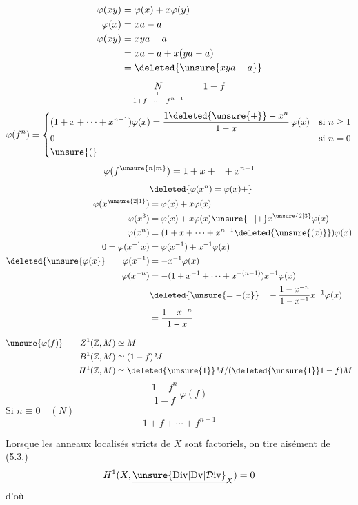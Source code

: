 {\[
\begin{aligned}
\varphi(xy)&=\varphi(x)+x\varphi(y)\\
\varphi(x)&=xa-a\\
\varphi(xy)&=xya-a\\
&=xa-a+x(ya-a)\\
&=\deleted{\unsure{xya-a}}
\end{aligned}
\]
\[
\underset{\substack{\shortparallel\\1+f+\cdots+f^{n-1}}}{N}\qquad 1-f
\]
\[
\varphi(f^n)=
\begin{cases}
(1+x+\cdots+x^{n-1})\varphi(x)=\dfrac{1\deleted{\unsure{+}}-x^n}{1-x}\,\varphi(x)&\text{si }n\geq1\\
0&\text{si }n=0\\
\unsure{(}&
\end{cases}
\]
\[
\varphi(f^{\unsure{n|m}})=1+x+\phantom{x} +x^{n-1}
\]
\[
\begin{aligned}
&\deleted{\varphi(x^n)=\varphi(x)+}\\
\varphi(x^{\unsure{2|1}})&=\varphi(x)+x\varphi(x)\\
\varphi(x^3)&=\varphi(x)+x\varphi(x)\unsure{-|+}x^{\unsure{2|3}}\varphi(x)\\
\varphi(x^n)&=(1+x+\cdots+x^{n-1}\deleted{\unsure{(x)}})\varphi(x)\\
0=\varphi(x^{-1}x)&=\varphi(x^{-1})+x^{-1}\varphi(x)\\
\deleted{\unsure{\varphi(x}}\qquad\varphi(x^{-1})&=-x^{-1}\varphi(x)\\
\varphi(x^{-n})&=-(1+x^{-1}+\cdots+x^{-(n-1)})x^{-1}\varphi(x)\\
&\deleted{\unsure{=-(x}}\quad-\frac{1-x^{-n}}{1-x^{-1}}x^{-1}\varphi(x)\\
&=\frac{1-x^{-n}}{1-x}
\end{aligned}
\]

\[
\begin{aligned}
\unsure{\varphi(f)}\qquad Z^1(\mathbb{Z},M)&\simeq M\\
B^1(\mathbb{Z},M)&\simeq (1-f)M\\
H^1(\mathbb{Z},M)&\simeq \deleted{\unsure{1}}M/(\deleted{\unsure{1}}1-f)M
\end{aligned}
\]
\[
\frac{1-f^n}{1-f}\,\varphi(f)
\]
Si $n\equiv0\quad(N)$
\[
1+f+\cdots+f^{n-1}
\]
}


Lorsque  les anneaux localisés stricts de $X$ sont factoriels, on tire aisément de (5.3.)
\[
H^1(X,\underline{\unsure{\mathrm{Div}|\mathrm{Dv}|\mathcal{D}\mathrm{iv}}}_X)=0
\]
d'où 

